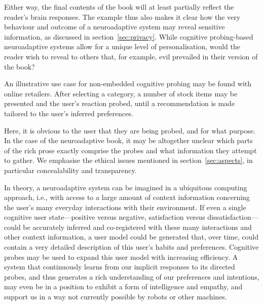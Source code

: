 Either way, the final contents of the book will at least partially reflect the reader's brain responses. The example thus also makes it clear how the very behaviour and outcome of a neuroadaptive system may reveal sensitive information, as discussed in section~\ref{sec:privacy}. While cognitive probing-based neuroadaptive systems allow for a unique level of personalisation, would the reader wish to reveal to others that, for example, evil prevailed in their version of the book? 

An illustrative use case for non-embedded cognitive probing may be found with online retailers. After selecting a category, a number of stock items may be presented and the user's reaction probed, until a recommendation is made tailored to the user's inferred preferences.

Here, it is obvious to the user that they are being probed, and for what purpose. In the case of the neuroadaptive book, it may be altogether unclear which parts of the rich prose exactly comprise the probes and what information they attempt to gather. We emphasise the ethical issues mentioned in section~\ref{sec:aspects}, in particular concealability and transparency.

In theory, a neuroadaptive system can be imagined in a ubiquitous computing approach, i.e., with access to a large amount of context information concerning the user's many everyday interactions with their environment. If even a single cognitive user state---positive versus negative, satisfaction versus dissatisfaction---could be accurately inferred and co-registered with these many interactions and other context information, a user model could be generated that, over time, could contain a very detailed description of this user's habits and preferences. Cognitive probes may be used to expand this user model with increasing efficiency. A system that continuously learns from our implicit responses to its directed probes, and thus generates a rich understanding of our preferences and intentions, may even be in a position to exhibit a form of intelligence and empathy, and support us in a way not currently possible by robots or other machines. 

